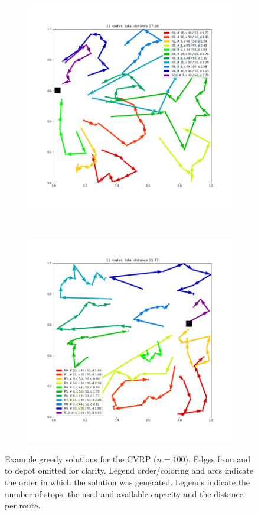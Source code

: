\begin{figure}
    \begin{subfigure}[b]{0.49\linewidth}
        \centerline{\includegraphics[trim={50 70 50 50},clip,width=\linewidth]{./images/cvrp_4}}
\caption{}
    \end{subfigure}
    ~
    \begin{subfigure}[b]{0.49\linewidth}
        \centerline{\includegraphics[trim={50 70 50 50},clip,width=\linewidth]{./images/cvrp_5}}
\caption{}
    \end{subfigure}
    \caption{Example greedy solutions for the CVRP ($n=100$). Edges from and to depot omitted for clarity. Legend order/coloring and arcs indicate the order in which the solution was generated. Legends indicate the number of stops, the used and available capacity and the distance per route.}\label{fig:cvrp_examples}
\end{figure}